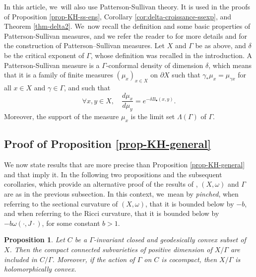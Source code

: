 \documentclass[JEP,XML,SOM,Unicode,NoEqCountersInSection,published]{cedram}
\newtheorem{proposition}[theorem]{Proposition}
\theoremstyle{definition}
\begin{document}
In this article, we~will also use Patterson-Sullivan theory. It is used in the proofs of Proposition \ref{prop-KH-ss-ens}, Corollary \ref{cor:delta-croissance-ssexp}, and Theorem \ref{thm-delta2}. We~now recall the definition and some basic properties of Patterson-Sullivan measures, and we refer the reader to \cite{roblinErgodiciteEquidistributionCourbure2003,pattersonLimitSetFuchsian1976, sullivanDensityInfinityDiscrete1979, nichollsErgodicTheoryDiscrete1989} for more details and for the construction of Patterson--Sullivan measures. Let $X$ and $\Gamma$ be as above, and $\delta$ be the critical exponent of $\Gamma$, whose definition was recalled in the introduction. A Patterson-Sullivan measure is a $\Gamma$\nobreakdash-conformal density of dimension $\delta$, which means that it is a family of finite measures $(\mu_x)_{x\in X}$ on $\partial X$ such that $\gamma_*\mu_x = \mu_{\gamma x}$ for all $x\in X$ and $\gamma\in \Gamma$, and such that
\begin{equation}\label{eq-prop-PS}
\forall x,y\in X,\quad \frac{d\mu_x}{d\mu_y}=e^{-\delta B_{\bullet}(x,y)}. \end{equation}
Moreover, the support of the measure $\mu_x$ is the limit set $\Lambda(\Gamma)$ of $\Gamma$.

\subsection{Proof of Proposition \ref{prop-KH-general}}\label{ss-section-preuve-prop5}

We now state results that are more precise than Proposition \ref{prop-KH-general} and that imply it. In the following two propositions and the subsequent corollaries, which provide an alternative proof of the results of \cite{deyNoteComplexhyperbolicKleinian2020}, $(X,\omega)$ and $\Gamma$ are as in the previous subsection. In this context, we~mean by \textit{pinched}, when referring to the sectional curvature of $(X,\omega)$, that it is bounded below by $-b$, and when referring to the Ricci curvature, that it is bounded below by $-b\omega(\cdot,J\cdot)$, for some constant $b>1$.

\begin{proposition}\label{prop-KH-hol-cvx}
Let $C$ be a $\Gamma$\nobreakdash-invariant closed and geodesically convex subset of~$X$. Then the compact connected subvarieties of positive dimension of $X/\Gamma$ are included in $C/\Gamma$. Moreover, if the action of $\Gamma$ on $C$ is cocompact, then $X/\Gamma$ is holomorphically convex.
\end{proposition}
\end{document}
